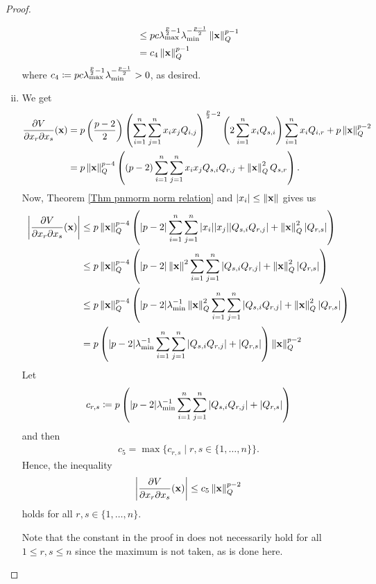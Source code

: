 \documentclass[a4paper,12pt,twoside,BCOR=10mm]{scrbook}
\begin{document}
\begin{proof}
\begin{enumerate}[i)]
\begin{align*}
            &\leq pc\lambda_{\max}^{\frac{p}{2}-1}\lambda_{\min}^{-\frac{p -1}{2}} \left\lVert\mathbf{x}\right\rVert_{Q}^{p - 1}\\
            &= c_4 \left\lVert\mathbf{x}\right\rVert_{Q}^{p-1}
        \end{align*}
        where $c_4 \coloneqq pc\lambda_{\max}^{\frac{p}{2}-1}\lambda_{\min}^{-\frac{p -1}{2}} > 0$, as desired.
    \item We get
    \begin{align*}
        \frac{\partial V}{\partial x_r \partial x_s}(\mathbf{x}) &= p\left(\frac{p - 2}{2}\right)\left (\sum_{i = 1}^n\sum_{j = 1}^n x_ix_j Q_{i,j} \right)^{\frac{p}{2} - 2} \left(2 \sum_{i = 1}^n x_i Q_{s,i}\right)\sum_{i = 1}^n x_i Q_{i,r} + p\left\lVert\mathbf{x}\right\rVert_{Q}^{p-2}\\
        &= p\left\lVert\mathbf{x}\right\rVert_{Q}^{p-4}\left( (p-2)\sum\limits_{i = 1}^n\sum\limits_{j = 1}^n x_i x_j Q_{s,i}Q_{r,j} + \left\lVert\mathbf{x}\right\rVert_{Q}^{2}Q_{s,r}\right).
    \end{align*}
    Now, Theorem \ref{Thm pnmorm norm relation} and $|x_i| \leq \left\lVert\mathbf{x}\right\rVert$ gives us
    \begin{align*}
        \left | \frac{\partial V}{\partial x_r \partial x_s}(\mathbf{x}) \right | &\leq p\left\lVert\mathbf{x}\right\rVert_{Q}^{p-4}\left(|p-2| \sum\limits_{i = 1}^n\sum\limits_{j = 1}^n |x_i||x_j||Q_{s,i}Q_{r,j}| + \left\lVert\mathbf{x}\right\rVert_{Q}^{2}|Q_{r,s}|\right)\\
        &\leq p\left\lVert\mathbf{x}\right\rVert_{Q}^{p-4}\left(|p-2| \left\lVert\mathbf{x}\right\rVert^2 \sum\limits_{i = 1}^n\sum\limits_{j = 1}^n|Q_{s,i}Q_{r,j}| + \left\lVert\mathbf{x}\right\rVert_{Q}^{2}|Q_{r,s}| \right)\\
        &\leq p\left\lVert\mathbf{x}\right\rVert_{Q}^{p-4}\left(|p-2| \lambda_{\min}^{-1}\left\lVert\mathbf{x}\right\rVert_{Q}^{2} \sum\limits_{i = 1}^n\sum\limits_{j = 1}^n|Q_{s,i}Q_{r,j}| + \left\lVert\mathbf{x}\right\rVert_{Q}^{2}|Q_{r,s}| \right)\\
        &= p\left(|p-2|\lambda_{\min}^{-1} \sum\limits_{i = 1}^n\sum\limits_{j = 1}^n|Q_{s,i}Q_{r,j}| + |Q_{r,s}| \right)\left\lVert\mathbf{x}\right\rVert_{Q}^{p-2}
    \end{align*}
    Let
    \begin{align*}
        c_{r,s} \coloneqq p\left(|p-2|\lambda_{\min}^{-1} \sum\limits_{i = 1}^n\sum\limits_{j = 1}^n|Q_{s,i}Q_{r,j}| + |Q_{r,s}| \right)
    \end{align*}
    and then
    \begin{align*}
        c_5 = \max\{c_{r,s} \mid r,s\in\{1,\ldots, n\}\}.
    \end{align*}
    Hence, the inequality
    \begin{align*}
        \left| \frac{\partial V}{\partial x_r\partial x_s}(\mathbf{x})\right| \leq c_5 \left\lVert\mathbf{x}\right\rVert_{Q}^{p-2}
    \end{align*}
    holds for all $r,s \in \{1,\ldots, n\}$.
    
    Note that the constant in the proof in \citep{Ha2019BMI} does not necessarily hold for all $1\leq r,s \leq n$ since the maximum is not taken, as is done here.
\end{enumerate}
\end{proof}
\fi
\end{document}
